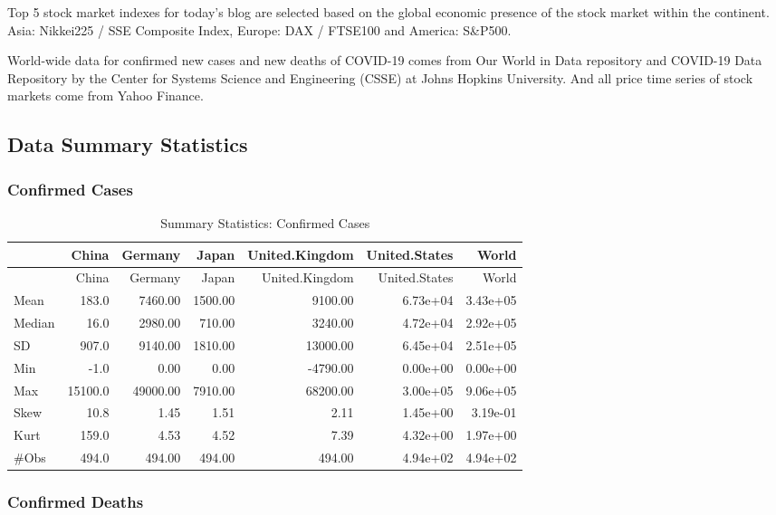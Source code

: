 \documentclass[
  11pt,
]{article}
\begin{document}
Top 5 stock market indexes for today's blog are selected based on the
global economic presence of the stock market within the continent. Asia:
Nikkei225 / SSE Composite Index, Europe: DAX / FTSE100 and America:
S\&P500.

World-wide data for confirmed new cases and new deaths of COVID-19 comes
from Our World in Data repository and COVID-19 Data Repository by the
Center for Systems Science and Engineering (CSSE) at Johns Hopkins
University. And all price time series of stock markets come from Yahoo
Finance.

\hypertarget{data-summary-statistics}{%
\subsection{Data Summary Statistics}\label{data-summary-statistics}}

\hypertarget{confirmed-cases}{%
\subsubsection{Confirmed Cases}\label{confirmed-cases}}

\begin{longtable}[]{@{}lrrrrrr@{}}
\caption{Summary Statistics: Confirmed Cases}\tabularnewline
\toprule
& China & Germany & Japan & United.Kingdom & United.States & World \\
\midrule
\endfirsthead
\toprule
& China & Germany & Japan & United.Kingdom & United.States & World \\
\midrule
\endhead
Mean & 183.0 & 7460.00 & 1500.00 & 9100.00 & 6.73e+04 & 3.43e+05 \\
Median & 16.0 & 2980.00 & 710.00 & 3240.00 & 4.72e+04 & 2.92e+05 \\
SD & 907.0 & 9140.00 & 1810.00 & 13000.00 & 6.45e+04 & 2.51e+05 \\
Min & -1.0 & 0.00 & 0.00 & -4790.00 & 0.00e+00 & 0.00e+00 \\
Max & 15100.0 & 49000.00 & 7910.00 & 68200.00 & 3.00e+05 & 9.06e+05 \\
Skew & 10.8 & 1.45 & 1.51 & 2.11 & 1.45e+00 & 3.19e-01 \\
Kurt & 159.0 & 4.53 & 4.52 & 7.39 & 4.32e+00 & 1.97e+00 \\
\#Obs & 494.0 & 494.00 & 494.00 & 494.00 & 4.94e+02 & 4.94e+02 \\
\bottomrule
\end{longtable}

\hypertarget{confirmed-deaths}{%
\subsubsection{Confirmed Deaths}\label{confirmed-deaths}}
\end{document}
